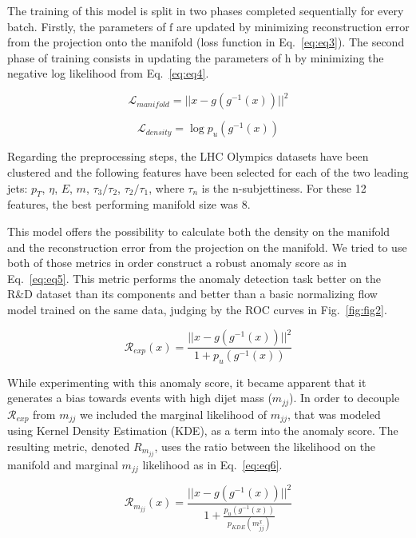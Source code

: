 \documentclass[letterpaper,11pt]{article}
\begin{document}
The training of this model is split in two phases completed sequentially for every batch. Firstly, the parameters of $ \mathrm{f}$ are updated by minimizing reconstruction error from the projection onto the manifold (loss function in Eq.~\ref{eq:eq3}). The second phase of training consists in updating the parameters of $\mathrm{h}$ by minimizing the negative log likelihood from Eq.~\ref{eq:eq4}. 

\begin{equation}
    \mathcal{L}_{manifold} = \lvert \lvert x-g(g^{-1}(x)) \lvert \lvert ^2
    \label{eq:eq3}
\end{equation}

\begin{equation}
    \mathcal{L}_{density} = \log p_{u}(g^{-1}(x))
    \label{eq:eq4}
\end{equation}

Regarding the preprocessing steps, the LHC Olympics datasets have been clustered and the following features have been selected for each of the two leading jets: $p_T$, $\eta$, $E$, $m$, $\tau_3/\tau_2$, $\tau_2/\tau_1$, where $\tau_n$ is the n-subjettiness. For these 12 features, the best performing manifold size was 8.

This model offers the possibility to calculate both the density on the manifold and the reconstruction error from the projection on the manifold. We tried to use both of those metrics in order construct a robust anomaly score as in Eq.~\ref{eq:eq5}. This metric performs the anomaly detection task better on the R\&D dataset than its components and better than a basic normalizing flow model trained on the same data, judging by the ROC curves in Fig.~\ref{fig:fig2}.

\begin{equation}
    \mathcal{R}_{exp}(x) = \frac{\lvert \lvert x-g(g^{-1}(x)) \lvert \lvert ^2}{1+p_{u}(g^{-1}(x))}
    \label{eq:eq5}
\end{equation}

While experimenting with this anomaly score, it became apparent that it generates a bias towards events with high dijet mass ($m_{jj}$). In order to decouple $ \mathcal{R}_{exp}$ from $m_{jj}$ we included the marginal likelihood of $m_{jj}$, that was modeled using Kernel Density Estimation (KDE), as a term into the anomaly score. The resulting metric, denoted ${R}_{m_{jj}}$, uses the ratio between the likelihood on the manifold and marginal $m_{jj}$ likelihood as in Eq.~\ref{eq:eq6}.

\begin{equation}
    \mathcal{R}_{m_{jj}}(x) = \frac{\lvert \lvert x-g(g^{-1}(x)) \lvert \lvert ^2}{1+\frac{p_{u}(g^{-1}(x))}{p_{KDE}(m^{x}_{jj})}}
    \label{eq:eq6}
\end{equation}
\end{document}
